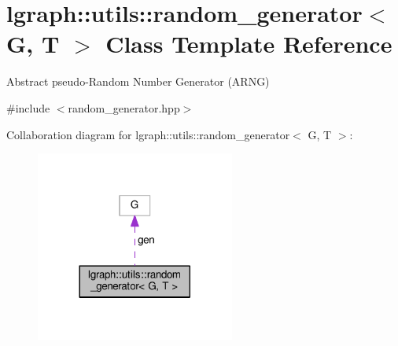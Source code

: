 \hypertarget{classlgraph_1_1utils_1_1random__generator}{}\section{lgraph\+:\+:utils\+:\+:random\+\_\+generator$<$ G, T $>$ Class Template Reference}
\label{classlgraph_1_1utils_1_1random__generator}


Abstract pseudo-\/\+Random Number Generator (A\+R\+NG)  




{\ttfamily \#include $<$random\+\_\+generator.\+hpp$>$}



Collaboration diagram for lgraph\+:\+:utils\+:\+:random\+\_\+generator$<$ G, T $>$\+:
\nopagebreak
\begin{figure}[H]
\begin{center}
\leavevmode
\includegraphics[width=185pt]{classlgraph_1_1utils_1_1random__generator__coll__graph}
\end{center}
\end{figure}
